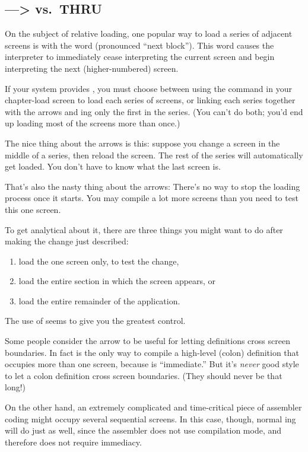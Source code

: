 \subsection{--\/--> vs.\ THRU}

On the subject of relative loading, one popular way to load a series of adjacent
screens is with the word \forth{-{}->} (pronounced ``next block'').  This word
causes the interpreter to immediately cease interpreting the current
screen and begin interpreting the next (higher-numbered) screen.

If your system provides \forth{-{}->}, you must choose between using the
 command in your chapter-load screen to load each series of
screens, or linking each series together with the arrows and ing
only the first in the series.  (You can't do both; you'd end up loading most
of the screens more than once.)

The nice thing about the arrows is this: suppose you change a screen
in the middle of a series, then reload the screen.  The rest of the series will
automatically get loaded.  You don't have to know what the last screen is.

That's also the nasty thing about the arrows: There's no way to stop
the loading process once it starts.  You may compile a lot more screens
than you need to test this one screen.

To get analytical about it, there are three things you might want to
do after making the change just described:
\begin{enumerate}
\item load the one screen only, to test the change,
\item load the entire section in which the screen appears,
or
\item load the entire remainder of the application.
\end{enumerate}
The use of  seems to give you the greatest control.

Some people consider the arrow to be useful for letting definitions
cross screen boundaries.  In fact \forth{-{}->} is the only way to compile a high-level
(colon) definition that occupies more than one screen, because \forth{-{}->} is
``immediate.'' But it's \emph{never} good style to let a colon definition cross
screen boundaries.  (They should never be that long!)

On the other hand, an extremely complicated and time-critical piece
of assembler coding might occupy several sequential screens.  In this
case, though, normal ing will do just as well, since the assembler
does not use compilation mode, and therefore does not require
immediacy.

